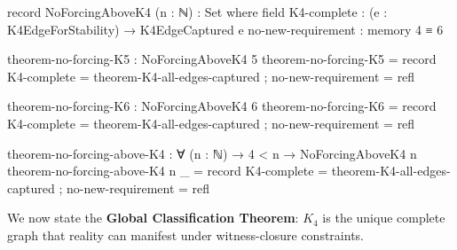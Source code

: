 \documentclass[11pt,a4paper]{book}
\begin{document}
\begin{code}
record NoForcingAboveK4 (n : ℕ) : Set where
  field
    K4-complete        : (e : K4EdgeForStability) → K4EdgeCaptured e
    no-new-requirement : memory 4 ≡ 6

theorem-no-forcing-K5 : NoForcingAboveK4 5
theorem-no-forcing-K5 = record
  { K4-complete        = theorem-K4-all-edges-captured
  ; no-new-requirement = refl
  }

theorem-no-forcing-K6 : NoForcingAboveK4 6
theorem-no-forcing-K6 = record
  { K4-complete        = theorem-K4-all-edges-captured
  ; no-new-requirement = refl
  }

theorem-no-forcing-above-K4 : ∀ (n : ℕ) → 4 < n → NoForcingAboveK4 n
theorem-no-forcing-above-K4 n _ = record
  { K4-complete = theorem-K4-all-edges-captured
  ; no-new-requirement = refl
  }
\end{code}

We now state the \textbf{Global Classification Theorem}: $K_4$ is the unique complete graph that reality can manifest under witness-closure constraints.
\end{document}
